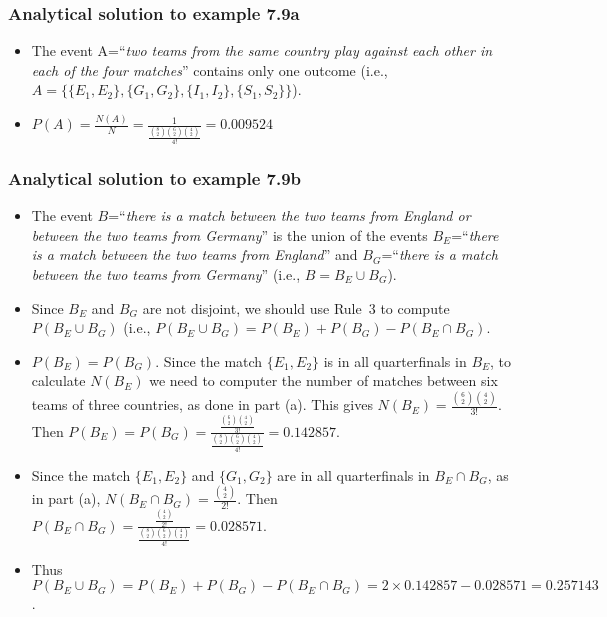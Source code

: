 \begin{frame}
    \frametitle{Analytical solution to example 7.9a}
    \begin{itemize}[<+->]
        \item The event A=``\textit{two teams from the same country play against
            each other in each of the four matches}'' contains only one outcome
            (i.e., $A=\{\{E_1,E_2\},\{G_1,G_2\},\{I_1,I_2\},\{S_1,S_2\}\}$).

        \item
            $P(A)=\frac{N(A)}{N}=\frac{1}{\frac{\binom{8}{2}\binom{6}{2}\binom{4}{2}}{4!}}=0.009524$

    \end{itemize}
\end{frame}

\begin{frame}
    \frametitle{Analytical solution to example 7.9b}
    \begin{itemize}[<+->]
        \scriptsize
        \item The event $B$=``\textit{there is a match between the two teams from
            England or between the two teams from Germany}'' is the union of
            the events $B_E$=``\textit{there is a match between the two teams
            from England}'' and $B_G$=``\textit{there is a match between the
            two teams from Germany}'' (i.e., $B=B_E\cup B_G$).

        \item Since $B_E$ and $B_G$ are not disjoint, we should use Rule~3 to
            compute $P(B_E\cup B_G)$ (i.e., $P(B_E\cup B_G)=P(B_E)+P(B_G)-P(B_E\cap B_G)$.

        \item $P(B_E)=P(B_G)$. Since the match $\{E_1,E_2\}$ is in all
            quarterfinals in $B_E$, to calculate $N(B_E)$ we need to computer
            the number of matches between six teams of three countries, as done
            in part (a). This gives
            $N(B_E)=\frac{\binom{6}{2}\binom{4}{2}}{3!}$. Then
            $P(B_E)=P(B_G)=\frac{\frac{\binom{6}{2}\binom{4}{2}}{3!}}{\frac{\binom{8}{2}\binom{6}{2}\binom{4}{2}}{4!}}=0.142857$.

        \item Since the match $\{E_1,E_2\}$ and $\{G_1,G_2\}$ are in all
            quarterfinals in $B_E\cap B_G$, as in part (a),
            $N(B_E\cap B_G)=\frac{\binom{4}{2}}{2!}$. Then $P(B_E\cap
            B_G)=\frac{\frac{\binom{4}{2}}{2!}}{\frac{\binom{8}{2}\binom{6}{2}\binom{4}{2}}{4!}}=0.028571$.

        \item Thus $P(B_E\cup B_G)=P(B_E)+P(B_G)-P(B_E\cap B_G)=2\times 0.142857-0.028571=0.257143$.
        \normalsize

    \end{itemize}
\end{frame}


